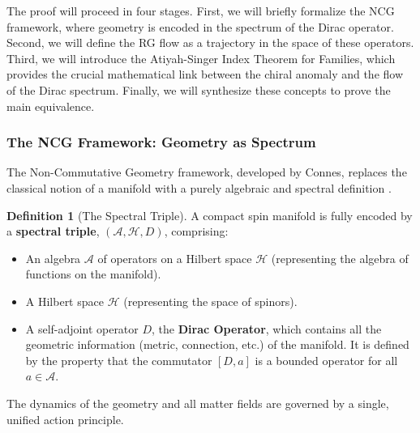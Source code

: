 \documentclass[11pt, letterpaper]{report}
\theoremstyle{plain} %
\theoremstyle{definition} %
\newtheorem{definition}{Definition}[chapter]
\theoremstyle{remark} %
\begin{document}
The proof will proceed in four stages. First, we will briefly formalize the NCG framework, where geometry is encoded in the spectrum of the Dirac operator. Second, we will define the RG flow as a trajectory in the space of these operators. Third, we will introduce the Atiyah-Singer Index Theorem for Families, which provides the crucial mathematical link between the chiral anomaly and the flow of the Dirac spectrum. Finally, we will synthesize these concepts to prove the main equivalence.

\subsubsection{The NCG Framework: Geometry as Spectrum}

The Non-Commutative Geometry framework, developed by Connes, replaces the classical notion of a manifold with a purely algebraic and spectral definition \cite{Connes1994NCG, Connes1996Gravity}.

\begin{definition}[The Spectral Triple]
A compact spin manifold is fully encoded by a \textbf{spectral triple}, $(\mathcal{A}, \mathcal{H}, D)$, comprising:
\begin{itemize}
    \item An algebra $\mathcal{A}$ of operators on a Hilbert space $\mathcal{H}$ (representing the algebra of functions on the manifold).
    \item A Hilbert space $\mathcal{H}$ (representing the space of spinors).
    \item A self-adjoint operator $D$, the \textbf{Dirac Operator}, which contains all the geometric information (metric, connection, etc.) of the manifold. It is defined by the property that the commutator $[D, a]$ is a bounded operator for all $a \in \mathcal{A}$.
\end{itemize}
\end{definition}

The dynamics of the geometry and all matter fields are governed by a single, unified action principle.
\end{document}
